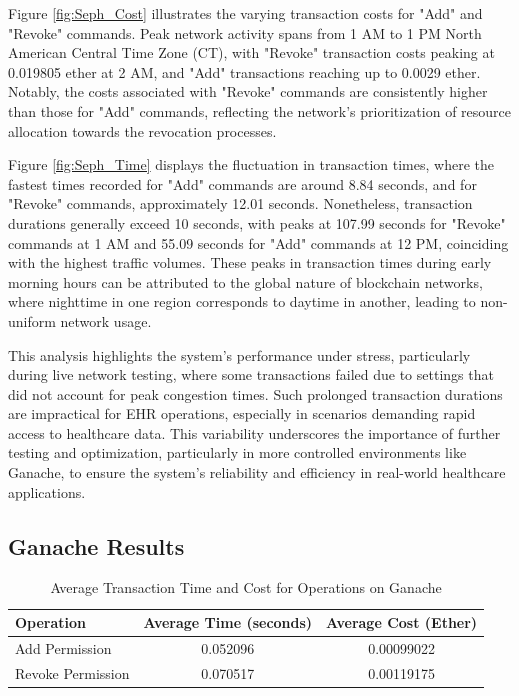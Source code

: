 \documentclass[12pt]{report}
\begin{document}
Figure \ref{fig:Seph_Cost} illustrates the varying transaction costs for "Add" and "Revoke" commands. Peak network activity spans from 1 AM to 1 PM North American Central Time Zone (CT), with "Revoke" transaction costs peaking at 0.019805 ether at 2 AM, and "Add" transactions reaching up to 0.0029 ether. Notably, the costs associated with "Revoke" commands are consistently higher than those for "Add" commands, reflecting the network's prioritization of resource allocation towards the revocation processes.

Figure \ref{fig:Seph_Time} displays the fluctuation in transaction times, where the fastest times recorded for "Add" commands are around 8.84 seconds, and for "Revoke" commands, approximately 12.01 seconds. Nonetheless, transaction durations generally exceed 10 seconds, with peaks at 107.99 seconds for "Revoke" commands at 1 AM and 55.09 seconds for "Add" commands at 12 PM, coinciding with the highest traffic volumes. These peaks in transaction times during early morning hours can be attributed to the global nature of blockchain networks, where nighttime in one region corresponds to daytime in another, leading to non-uniform network usage.

This analysis highlights the system's performance under stress, particularly during live network testing, where some transactions failed due to settings that did not account for peak congestion times. Such prolonged transaction durations are impractical for EHR operations, especially in scenarios demanding rapid access to healthcare data. This variability underscores the importance of further testing and optimization, particularly in more controlled environments like Ganache, to ensure the system's reliability and efficiency in real-world healthcare applications.

\subsection{Ganache Results}

\begin{table}[ht]
\centering
\begin{tabular}{lcc}
\hline
Operation & Average Time (seconds) & Average Cost (Ether) \\
\hline
Add Permission & 0.052096 & 0.00099022 \\
Revoke Permission & 0.070517 & 0.00119175 \\
\hline
\end{tabular}
\caption{Average Transaction Time and Cost for Operations on Ganache}
\label{tab:Ganache}
\end{table}
\end{document}
